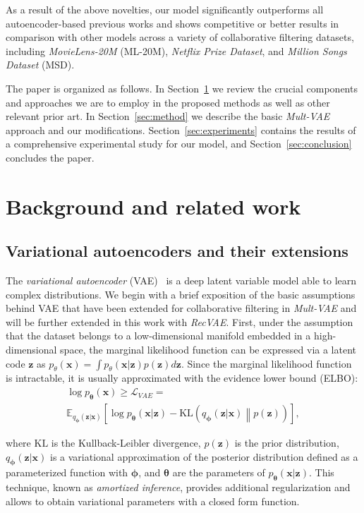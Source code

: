 \documentclass[sigconf,authorversion]{acmart}
\newcommand{\KL}[2]{\mathrm{KL}\left(#1 \middle\| #2\right)}
\def\bz{{\bf z}}
\def\btheta{{\boldsymbol{\theta}}}
\def\bphi{{\boldsymbol{\phi}}}
\def\bz{\boldsymbol{z}}
\def\bx{\boldsymbol{x}}
\begin{document}
As a result of the above novelties, our model significantly outperforms all autoencoder-based previous works and shows competitive or better results in comparison with other models across a variety of collaborative filtering datasets, including \emph{MovieLens-20M} (ML-20M), \emph{Netflix Prize Dataset}, and \emph{Million Songs Dataset} (MSD).

The paper is organized as follows. In Section~\ref{sec:background} we review the crucial components and approaches we are to employ in the proposed methods as well as other relevant prior art.
In Section~\ref{sec:method} we describe the basic \emph{Mult-VAE} approach and our modifications. Section~\ref{sec:experiments} contains the results of a comprehensive experimental study for our model, 
and Section~\ref{sec:conclusion} concludes the paper.

\section{Background and related work}\label{sec:background}

\subsection{Variational autoencoders and their extensions}\label{sec:vae}

The \emph{variational autoencoder} (VAE)~\cite{DBLP:journals/corr/KingmaW13,DBLP:conf/icml/RezendeMW14} is a deep latent variable model able to learn complex distributions. We begin with a brief exposition of the basic assumptions behind VAE that have been extended for collaborative filtering in \emph{Mult-VAE} and will be further extended in this work with \emph{RecVAE}. First, under the assumption that the dataset belongs to a low-dimensional manifold embedded in a high-dimensional space, the marginal likelihood function can be expressed via a latent code $\bz$ as $p_\theta(\bx) = \int p_\theta(\bx|\bz)p(\bz)d\bz$. Since the marginal likelihood function is intractable, it is usually approximated with the evidence lower bound (ELBO):
\begin{multline}\label{eq:elbo_vae}
    \log p_{\btheta}(\bx) \ge \mathcal{L}_{VAE} = \\
    \mathbb{E}_{q_{\bphi}(\bz|\bx)}\left[\log p_{\btheta}(\bx|\bz) - \KL{q_{\bphi}(\bz|\bx)}{p(\bz)}\right],
\end{multline}

\noindent
where $\mathrm{KL}$ is the Kullback-Leibler divergence, $p(\bz)$ is the prior distribution, $q_{\bphi}(\bz|\bx)$ is a variational approximation of the posterior distribution defined as a parameterized function with $\bphi$, and $\btheta$ are the parameters of $p_{\btheta}(\bx|\bz)$. This technique, known as \emph{amortized inference}, provides additional regularization and allows to obtain variational parameters with a closed form function. 
\end{document}

